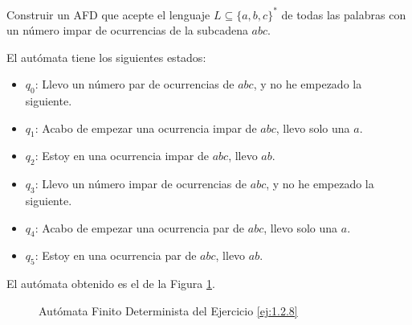 \begin{ejercicio} \label{ej:1.2.8}
    Construir un AFD que acepte el lenguaje $L \subseteq \{a, b, c\}^*$ de todas las palabras con un número impar de ocurrencias de la subcadena $abc$.

    El autómata tiene los siguientes estados:
    \begin{itemize}
        \item $q_0$: Llevo un número par de ocurrencias de $abc$, y no he empezado la siguiente.
        \item $q_1$: Acabo de empezar una ocurrencia impar de $abc$, llevo solo una $a$.
        \item $q_2$: Estoy en una ocurrencia impar de $abc$, llevo $ab$.
        \item $q_3$: Llevo un número impar de ocurrencias de $abc$, y no he empezado la siguiente.
        \item $q_4$: Acabo de empezar una ocurrencia par de $abc$, llevo solo una $a$.
        \item $q_5$: Estoy en una ocurrencia par de $abc$, llevo $ab$.
    \end{itemize}

    El autómata obtenido es el de la Figura \ref{fig:ej:1.2.8}.
    \begin{figure}
        \centering
        \caption{Autómata Finito Determinista del Ejercicio \ref{ej:1.2.8}}
        \label{fig:ej:1.2.8}
    \end{figure}
\end{ejercicio}


